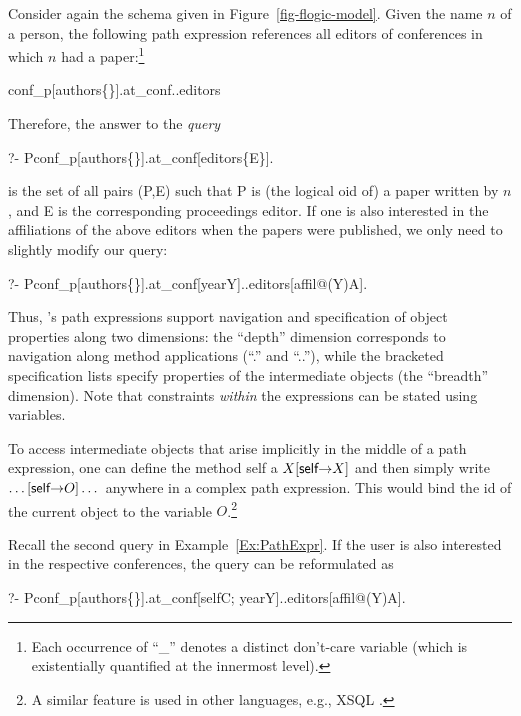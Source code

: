 \begin{example}\label{Ex:PathExpr}
  Consider again the schema given in Figure~\ref{fig-flogic-model}.
  Given the name $n$ of a person, the following path expression
  references all editors of conferences in which $n$ had a
  paper:\footnote{Each occurrence of ``\_'' denotes a distinct
    don't-care variable (which is existentially quantified at the
    innermost level).}
\begin{qrules}
  \anon\isa conf\_p[authors\mvd\{\anon [name\fd $n$]\}].at\_conf..editors
\end{qrules}
Therefore, the answer to the \emph{query}
\begin{qrules}
  ?- P\isa conf\_p[authors\mvd\{\anon [name\fd
  $n$]\}].at\_conf[editors\mvd\{E\}].
\end{qrules}
is the set of all pairs (\textsf{P},\textsf{E}) such that \textsf{P}
is (the logical oid of) a paper written by $n$, and \textsf{E} is the
corresponding proceedings editor.  If one is also interested in the
affiliations of the above editors when the papers were published, we only
need to slightly modify our query:
\begin{qrules}
  ?- P\isa conf\_p[authors\mvd\{\anon [name\fd
  $n$]\}].at\_conf[year\fd Y]..editors[affil@(Y)\fd A].
\end{qrules}
\end{example}
Thus, \FLIP's path expressions support navigation and specification
of object properties along two dimensions: the ``depth'' dimension
corresponds to navigation along method applications (``.''  and
``..''), while the bracketed specification lists specify
properties of the intermediate objects (the ``breadth'' dimension). Note
that constraints \emph{within} the expressions can be stated using
variables.

To access intermediate objects that arise implicitly in the middle
of a path expression, one can define the method \textsf{self} a
$X[\textsf{self}{\rightarrow} X]$ and then simply
write $\dots[\textsf{self}{\rightarrow} O]\dots$ anywhere in a complex
path expression. This would bind the id of the current object to the
variable $O$.\footnote{
  A similar feature is used in other
  languages, e.g., XSQL \cite{xsql-92}.
  }

\begin{example}\label{ex-path-self}
  Recall the second query in Example~\ref{Ex:PathExpr}. If the user is
  also interested in the respective conferences, the query can be
  reformulated as
\begin{qrules}
   ?- P\isa conf\_p[authors\mvd\{\anon [name\fd
   $n$]\}].at\_conf[self\fd C; year\fd Y]..editors[affil@(Y)\fd A]. 
\end{qrules}
\end{example}

